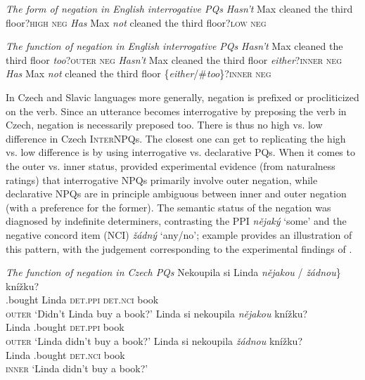 \documentclass[output=paper,colorlinks,citecolor=brown]{langscibook}
\begin{document}
\ea \textit{The form of negation in English interrogative PQs}
\ea \textit{Hasn't} Max cleaned the third floor?\hfill\textsc{high neg}\label{sim:ex:high}
\ex \textit{Has} Max \textit{not} cleaned the third floor?\hfill\textsc{low neg}\label{sim:ex:low}
\z\z

\ea \textit{The function of negation in English interrogative PQs}\label{sim:ex:inner-outer}
\ea \textit{Hasn't} Max cleaned the third floor \textit{too}?\hfill\textsc{outer neg}\label{sim:ex:outer}
\ex \textit{Hasn't} Max cleaned the third floor \textit{either}?\hfill\textsc{inner neg}\label{sim:ex:inner}
\ex \textit{Has} Max \textit{not} cleaned the third floor \{\textit{either}/\#\textit{too}\}?\hfill\textsc{inner neg}\label{sim:ex:inner.low}
\z\z

\noindent In Czech and Slavic languages more generally, negation is prefixed or procliticized on the verb. Since an utterance becomes interrogative by preposing the verb in Czech, negation is necessarily preposed too. There is thus no high vs. low difference in Czech \textsc{InterNPQ}s. The closest one can get to replicating the high vs. low difference is by using interrogative vs. declarative PQs. When it comes to the outer vs. inner status, \citet{Stankova2023} provided experimental evidence (from naturalness ratings) that interrogative NPQs primarily involve outer negation, while declarative NPQs are in principle ambiguous between inner and outer negation (with a preference for the former). The semantic status of the negation was diagnosed by indefinite determiners, contrasting the PPI \textit{nějaký} `some' and the negative concord item (NCI) \textit{žádný} `any/no'; example  provides an illustration of this pattern, with the judgement corresponding to the experimental findings of \citet{Stankova2023}.

\ea \textit{The function of negation in Czech PQs}\label{sim:ex:cz-inner-outer}
\ea\gll Nekoupila si Linda \minsp{\{} \textit{nějakou} /  \textit{žádnou}\} knížku?\\
{\NEG}.bought {\REFL} Linda {} \textsc{det.ppi} {} {} \textsc{det.nci} book\\\hfill\textsc{outer}
\glt `Didn't Linda buy a book?'
\ex\gll Linda si nekoupila \textit{nějakou} knížku?\\
Linda {\REFL} {\NEG}.bought \textsc{det.ppi} book\\\hfill\textsc{outer}
\glt `Linda didn't buy a book?'
\ex\gll Linda si nekoupila \textit{žádnou} knížku?\\
Linda {\REFL} {\NEG}.bought \textsc{det.nci} book\\\hfill\textsc{inner}
\glt `Linda didn't buy a book?'
\z\z
\end{document}
